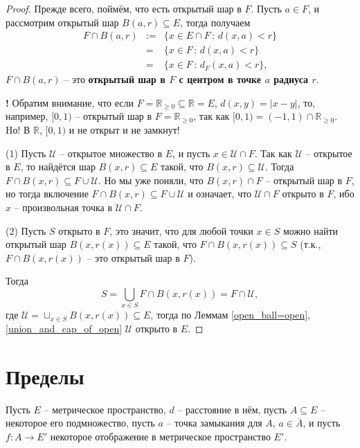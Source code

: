 \begin{proof}
    Прежде всего, поймём, что есть открытый шар в $F$. Пусть $a \in F$, и рассмотрим открытый шар $B(a,r) \subseteq E$, тогда получаем
    \begin{eqnarray*}
        F \cap B(a,r) &:=& \{x \in E \cap F\, :\, d(x,a)<r\} \\
        &=&\{x\in F\, :\, d(x,a)<r\} \\
        &=& \{x \in F\, :\, d_F(x,a)<r\},
    \end{eqnarray*}
    \ie $F \cap B(a,r)$ -- это \textbf{открытый шар в $F$ с центром в точке $a$ радиуса $r.$}

\begin{mydanger}{\bf{!}}
    Обратим внимание, что если $F = \mathbb{R}_{\ge 0} \subseteq \mathbb{R} = E$, $d(x,y) = |x-y|$, то, например, $[0,1)$ -- открытый шар в $F = \mathbb{R}_{\ge 0}$, так как $[0,1) = (-1,1) \cap \mathbb{R}_{\ge 0}$. Hо! В $\mathbb{R}$, $[0,1)$ и не открыт и не замкнут!
\end{mydanger}

(1) Пусть $\mathscr{U}$ -- открытое множество в $E$, и пусть $x \in \mathscr{U} \cap F$. Так как $\mathscr{U}$ -- открытое в $E$, то найдётся шар $B(x,r) \subseteq E$ такой, что $B(x,r) \subseteq \mathscr{U}$. Тогда $F \cap B(x,r) \subseteq F \cup \mathscr{U}$. Но мы уже поняли, что $B(x,r) \cap F$ -- открытый шар в $F$, но тогда включение $F \cap B(x,r) \subseteq F \cup \mathscr{U}$ и означает, что $\mathscr{U} \cap F$ открыто в $F$, ибо $x$ -- произвольная точка в $\mathscr{U} \cap F.$

(2) Пусть $S$ открыто в $F$, это значит, что для любой точки $x \in S$ можно найти открытый шар $B(x, r(x)) \subseteq E$ такой, что $F \cap B(x,r(x)) \subseteq S$ (т.к., $F \cap B(x,r(x))$ -- это открытый шар в $F$).

Тогда 
\[
 S = \bigcup_{x \in S} F \cap B(x, r(x)) = F \cap \mathscr{U},
\]
где $\mathscr{U} = \cup_{x\in S} B(x, r(x)) \subseteq E$, тогда по Леммам \ref{open_ball=open}, \ref{union_and_cap_of_open} $\mathscr{U}$ открыто в $E$.
\end{proof}

\section{Пределы}

Пусть $E$ -- метрическое пространство, $d$ -- расстояние в нём, пусть $A \subseteq E$ -- некоторое его подмножество, пусть $a$ -- точка замыкания для $A$, \ie $a \in \overline{A}$, и пусть $f:A \to E'$ некоторое отображение в метрическое пространство $E'.$

